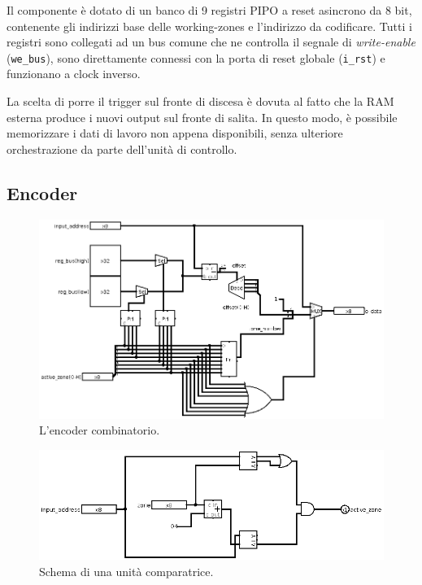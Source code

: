 \documentclass[11pt,a4paper]{article}
\begin{document}
Il componente è dotato di un banco di 9 registri PIPO a reset asincrono da 8 bit, contenente gli indirizzi base delle working-zones e l'indirizzo da
codificare. Tutti i registri sono collegati ad un bus comune che ne controlla il segnale di \emph{write-enable} (\lstinline{we_bus}), sono direttamente
connessi con la porta di reset globale (\lstinline{i_rst}) e funzionano a clock inverso.

La scelta di porre il trigger sul fronte di discesa è dovuta al fatto che la RAM esterna produce i nuovi output sul fronte di salita. In questo modo, è
possibile memorizzare i dati di lavoro non appena disponibili, senza ulteriore orchestrazione da parte dell'unità di controllo.

\subsection{Encoder}
\begin{figure}[htp]
    \includegraphics[scale=0.4]{encoder.png}
    \caption[Encoder]{L'encoder combinatorio.}
\end{figure}

\begin{figure}[hp]
    \includegraphics[scale=0.4]{comparator.png}
    \caption[Comparatore]{Schema di una unità comparatrice.\label{comparator}}
\end{figure}
\end{document}
